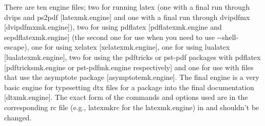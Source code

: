 \documentclass[11pt]{article}
\newcommand{\cmd}[1]{\textsf{#1}}
\begin{document}
There are ten \cmd{engine} files; two for running \cmd{latex} (one with a final run through \cmd{dvips} and \cmd{ps2pdf} [\cmd{latexmk.engine}] and one with a final run through \cmd{dvipdfmx} [\cmd{dvipdfmxmk.engine]}), two for using \cmd{pdflatex} [\cmd{pdflatexmk.engine} and \cmd{sepdflatexmk.engine}] (the second one for use when you need to use \cmd{-{}-shell-escape}), one for using \cmd{xelatex} [\cmd{xelatexmk.engine}], one for using \cmd{lualatex} [\cmd{lualatexmk.engine}], two for using the \cmd{pdftricks} or \cmd{pst-pdf} packages with \cmd{pdflatex} [\cmd{pdftricksmk.engine} or \cmd{pst-pdfmk.engine} respectively] and one for use with files that use the \cmd{asymptote} package [\cmd{asymptotemk.engine}]. The final engine is a very basic engine for typesetting \cmd{dtx} files for a package into the final documentation [\cmd{dtxmk.engine}]. The exact form of the commands and options used are in the corresponding \cmd{rc} file (e.g., \cmd{latexmkrc} for the \cmd{latexmk.engine}) in  and shouldn't be changed.
\end{document}
